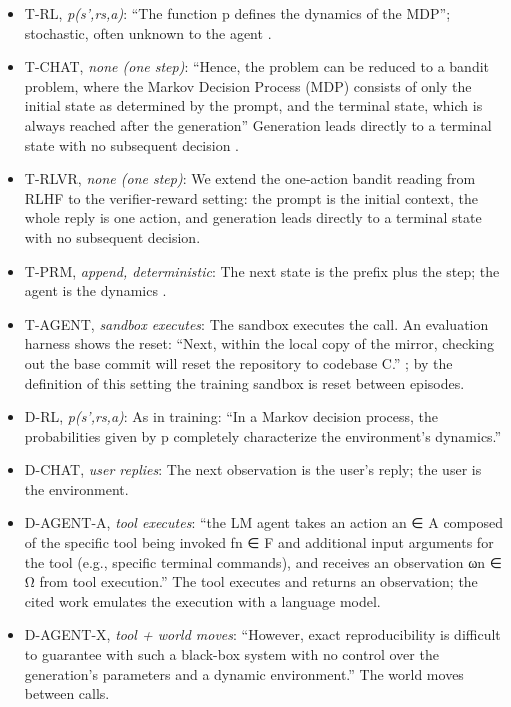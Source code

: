 \documentclass{article}
\providecommand{\tightlist}{\setlength{\itemsep}{0pt}\setlength{\parskip}{0pt}}
\begin{document}
\begin{itemize}
\tightlist
\item
  T-RL, \emph{p(s',r\textbar s,a)}: ``The function p defines the dynamics of the MDP''; stochastic, often unknown to the agent \citep{sutton2018}.
\item
  T-CHAT, \emph{none (one step)}: ``Hence, the problem can be reduced to a bandit problem, where the Markov Decision Process (MDP) consists of only the initial state as determined by the prompt, and the terminal state, which is always reached after the generation'' \citep{ahmadian2024} Generation leads directly to a terminal state with no subsequent decision \citep{xiong2024}.
\item
  T-RLVR, \emph{none (one step)}: We extend the one-action bandit reading from RLHF \citep{ahmadian2024} to the verifier-reward setting: the prompt is the initial context, the whole reply is one action, and generation leads directly to a terminal state with no subsequent decision.
\item
  T-PRM, \emph{append, deterministic}: The next state is the prefix plus the step; the agent is the dynamics \citep{feng2023}.
\item
  T-AGENT, \emph{sandbox executes}: The sandbox executes the call. An evaluation harness shows the reset: ``Next, within the local copy of the mirror, checking out the base commit will reset the repository to codebase C.'' \citep{jimenez2024}; by the definition of this setting the training sandbox is reset between episodes.
\item
  D-RL, \emph{p(s',r\textbar s,a)}: As in training: ``In a Markov decision process, the probabilities given by p completely characterize the environment's dynamics.'' \citep{sutton2018}
\item
  D-CHAT, \emph{user replies}: The next observation is the user's reply; the user is the environment.
\item
  D-AGENT-A, \emph{tool executes}: ``the LM agent takes an action an ∈ A composed of the specific tool being invoked fn ∈ F and additional input arguments for the tool (e.g., specific terminal commands), and receives an observation ωn ∈ Ω from tool execution.'' \citep{ruan2024} The tool executes and returns an observation; the cited work emulates the execution with a language model.
\item
  D-AGENT-X, \emph{tool + world moves}: ``However, exact reproducibility is difficult to guarantee with such a black-box system with no control over the generation's parameters and a dynamic environment.'' \citep{greshake2023} The world moves between calls.
\end{itemize}
\end{document}
